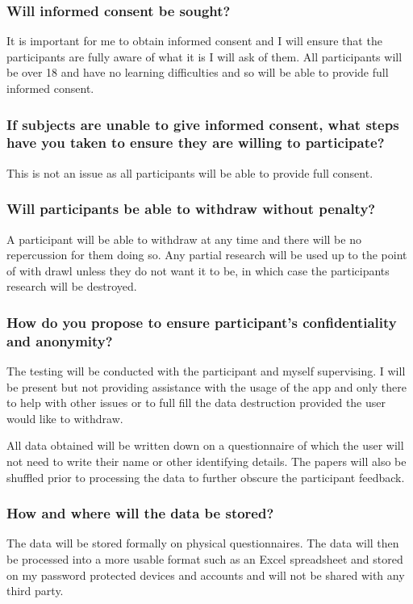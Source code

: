 \subsubsection{Will informed consent be
sought?}\label{will-informed-consent-be-sought}

It is important for me to obtain informed consent and I will ensure that
the participants are fully aware of what it is I will ask of them. All
participants will be over 18 and have no learning difficulties and so
will be able to provide full informed consent.

\subsubsection{If subjects are unable to give informed consent, what
steps have you taken to ensure they are willing to
participate?}\label{if-subjects-are-unable-to-give-informed-consent-what-steps-have-you-taken-to-ensure-they-are-willing-to-participate}

This is not an issue as all participants will be able to provide full
consent.

\subsubsection{Will participants be able to withdraw without
penalty?}\label{will-participants-be-able-to-withdraw-without-penalty}

A participant will be able to withdraw at any time and there will be no
repercussion for them doing so. Any partial research will be used up to
the point of with drawl unless they do not want it to be, in which case
the participants research will be destroyed.

\subsubsection{How do you propose to ensure participant's
confidentiality and
anonymity?}\label{how-do-you-propose-to-ensure-participants-confidentiality-and-anonymity}

The testing will be conducted with the participant and myself
supervising. I will be present but not providing assistance with the
usage of the app and only there to help with other issues or to full
fill the data destruction provided the user would like to withdraw.

All data obtained will be written down on a questionnaire of which the
user will not need to write their name or other identifying details. The
papers will also be shuffled prior to processing the data to further
obscure the participant feedback.

\subsubsection{How and where will the data be
stored?}\label{how-and-where-will-the-data-be-stored}

The data will be stored formally on physical questionnaires. The data
will then be processed into a more usable format such as an Excel
spreadsheet and stored on my password protected devices and accounts and
will not be shared with any third party.
